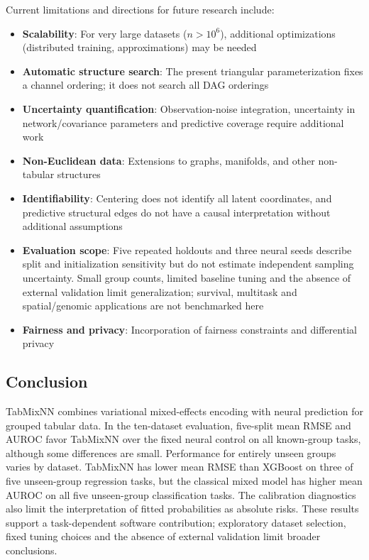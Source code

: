 \documentclass[12pt,a4paper]{article}
\begin{document}
Current limitations and directions for future research include:

\begin{itemize}
    \item \textbf{Scalability}: For very large datasets ($n > 10^6$), additional optimizations (distributed training, approximations) may be needed
    \item \textbf{Automatic structure search}: The present triangular parameterization fixes a channel ordering; it does not search all DAG orderings
    \item \textbf{Uncertainty quantification}: Observation-noise integration, uncertainty in network/covariance parameters and predictive coverage require additional work
    \item \textbf{Non-Euclidean data}: Extensions to graphs, manifolds, and other non-tabular structures
    \item \textbf{Identifiability}: Centering does not identify all latent coordinates, and predictive structural edges do not have a causal interpretation without additional assumptions
    \item \textbf{Evaluation scope}: Five repeated holdouts and three neural seeds describe split and initialization sensitivity but do not estimate independent sampling uncertainty. Small group counts, limited baseline tuning and the absence of external validation limit generalization; survival, multitask and spatial/genomic applications are not benchmarked here
    \item \textbf{Fairness and privacy}: Incorporation of fairness constraints and differential privacy
\end{itemize}

\subsection{Conclusion}

TabMixNN combines variational mixed-effects encoding with neural prediction for grouped tabular data. In the ten-dataset evaluation, five-split mean RMSE and AUROC favor TabMixNN over the fixed neural control on all known-group tasks, although some differences are small. Performance for entirely unseen groups varies by dataset. TabMixNN has lower mean RMSE than XGBoost on three of five unseen-group regression tasks, but the classical mixed model has higher mean AUROC on all five unseen-group classification tasks. The calibration diagnostics also limit the interpretation of fitted probabilities as absolute risks. These results support a task-dependent software contribution; exploratory dataset selection, fixed tuning choices and the absence of external validation limit broader conclusions.



\FloatBarrier

\FloatBarrier


\end{document}
